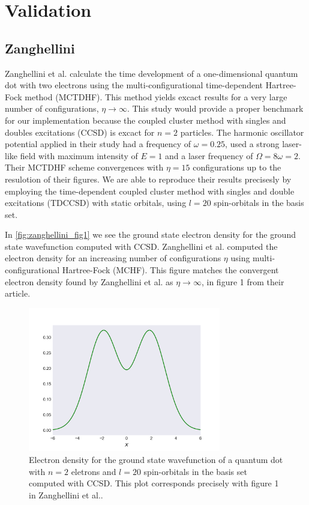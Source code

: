 \chapter{Validation}

\section{Zanghellini}

Zanghellini et al.\cite{Zanghellini04} calculate the time development of a 
one-dimensional quantum dot with two electrons using the multi-configurational 
time-dependent Hartree-Fock method (MCTDHF). This method yields excact results for 
a very large number of configurations, $\eta \to \infty$. This study would provide a 
proper benchmark for our implementation because the coupled cluster method with singles and 
doubles excitations (CCSD) is excact for $n=2$ particles. 
The harmonic oscillator potential applied in
their study had a frequency of $\omega=0.25$, used a strong laser-like field with 
maximum intensity of $E = 1$ and a laser frequency of $\Omega = 8 \omega = 2$.
Their MCTDHF scheme convergences with $\eta=15$
configurations up to the resulotion of their figures.
We are able to reproduce their results precisesly by employing the 
time-dependent coupled cluster method with singles and double excitations (TDCCSD) with 
static orbitals, using $l=20$ spin-orbitals in the basis set.

In \autoref{fig:zanghellini_fig1} we see the ground state electron density for the 
ground state wavefunction computed with CCSD. Zanghellini et al. computed the electron
density for an increasing number of configurations $\eta$ using multi-configurational
Hartree-Fock (MCHF). This figure matches the convergent electron density found by Zanghellini et al. 
as $\eta \to \infty$, in figure 1 from their article. 

\begin{figure}
    \centering
    \includegraphics[width=0.75\textwidth]{results/figures/zanghellini_fig1.png}
    \caption{
        \label{fig:zanghellini_fig1}
        Electron density for the ground state wavefunction of a quantum dot with 
        $n=2$ eletrons and $l=20$ spin-orbitals in the basis set computed with
        CCSD. This plot 
        corresponds precisely with figure 1 in Zanghellini et al.\cite{Zanghellini04}.
    }
\end{figure}

